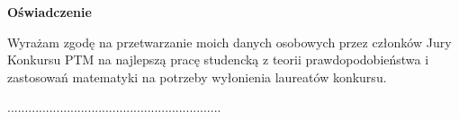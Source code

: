 \documentclass[]{article}
\begin{document}
\begin{center}
	\huge{{\bf Oświadczenie}}	
\end{center}
\vspace{1cm}
Wyrażam zgodę na przetwarzanie moich danych osobowych przez członków Jury Konkursu PTM na najlepszą pracę studencką z teorii prawdopodobieństwa i zastosowań matematyki na potrzeby wyłonienia laureatów konkursu.
\vspace{1cm}
\begin{flushright}
	.............................................................
\end{flushright}
\end{document}
